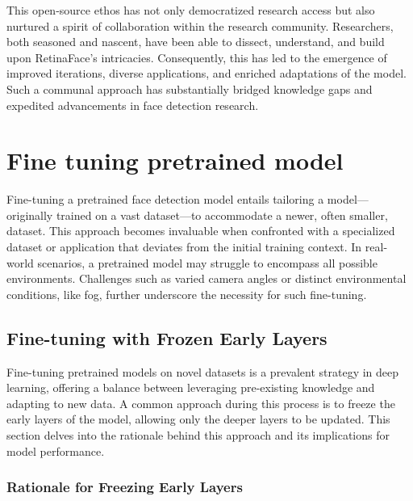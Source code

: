 \documentclass{article}
\begin{document}
This open-source ethos has not only democratized research access but also nurtured a spirit of collaboration within the research community. Researchers, both seasoned and nascent, have been able to dissect, understand, and build upon RetinaFace's intricacies. Consequently, this has led to the emergence of improved iterations, diverse applications, and enriched adaptations of the model. Such a communal approach has substantially bridged knowledge gaps and expedited advancements in face detection research.

\section{Fine tuning pretrained model}

Fine-tuning a pretrained face detection model entails tailoring a model—originally trained on a vast dataset—to accommodate a newer, often smaller, dataset. This approach becomes invaluable when confronted with a specialized dataset or application that deviates from the initial training context. In real-world scenarios, a pretrained model may struggle to encompass all possible environments. Challenges such as varied camera angles or distinct environmental conditions, like fog, further underscore the necessity for such fine-tuning.
\subsection{Fine-tuning with Frozen Early Layers}

Fine-tuning pretrained models on novel datasets is a prevalent strategy in deep learning, offering a balance between leveraging pre-existing knowledge and adapting to new data. A common approach during this process is to freeze the early layers of the model, allowing only the deeper layers to be updated. This section delves into the rationale behind this approach and its implications for model performance.

\subsubsection{Rationale for Freezing Early Layers}
\end{document}
